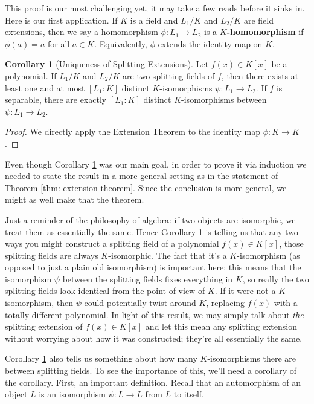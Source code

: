 \documentclass[11pt]{article}
\theoremstyle{definition}
\newtheorem{corollary}[theorem]{Corollary}
\numberwithin{equation}{subsection}
\begin{document}
This proof is our most challenging yet, it may take a few reads before it sinks in.
Here is our first application.
If $K$ is a field and $L_1/K$ and $L_2/K$ are field extensions, then we say a homomorphism $\phi : L_1 \to L_2$ is a \textbf{$K$-homomorphism} if $\phi(a) = a$ for all $a \in K$.
Equivalently, $\phi$ extends the identity map on $K$.

\begin{corollary}[Uniqueness of Splitting Extensions]
\label{cor: uniqueness of splitting extensions}
    Let $f(x) \in K[x]$ be a polynomial.
    If $L_1/K$ and $L_2/K$ are two splitting fields of $f$, then there exists at least one and at most $[L_1 : K]$ distinct $K$-isomorphisms $\psi : L_1 \to L_2$.
    If $f$ is separable, there are exactly $[L_1 : K]$ distinct $K$-isomorphisms between $\psi : L_1 \to L_2$.
\end{corollary}

\begin{proof}
    We directly apply the Extension Theorem to the identity map $\phi : K \to K$.
\end{proof}

Even though Corollary \ref{cor: uniqueness of splitting extensions} was our main goal, in order to prove it via induction we needed to state the result in a more general setting as in the statement of Theorem \ref{thm: extension theorem}.
Since the conclusion is more general, we might as well make that the theorem.

Just a reminder of the philosophy of algebra: if two objects are isomorphic, we treat them as essentially the same.
Hence Corollary \ref{cor: uniqueness of splitting extensions} is telling us that any two ways you might construct a splitting field of a polynomial $f(x) \in K[x]$, those splitting fields are always $K$-isomorphic.
The fact that it's a $K$-isomorphism (as opposed to just a plain old isomorphism) is important here: this means that the isomorphism $\psi$ between the splitting fields fixes everything in $K$, so really the two splitting fields look identical from the point of view of $K$.
If it were not a $K$-isomorphism, then $\psi$ could potentially twist around $K$, replacing $f(x)$ with a totally different polynomial.
In light of this result, we may simply talk about \emph{the} splitting extension of $f(x) \in K[x]$ and let this mean any splitting extension without worrying about how it was constructed; they're all essentially the same.

Corollary \ref{cor: uniqueness of splitting extensions} also tells us something about how many $K$-isomorphisms there are between splitting fields.
To see the importance of this, we'll need a corollary of the corollary.
First, an important definition.
Recall that an automorphism of an object $L$ is an isomorphism $\psi : L \to L$ from $L$ to itself.
\end{document}
